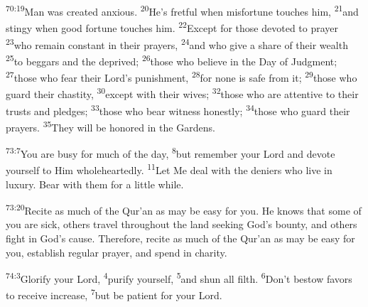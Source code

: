 \documentclass[openany,12pt,english]{book}
\newenvironment{para}{\par\pretolerance=100\tolerance=200\setlength{\emergencystretch}{0.6em}\relax}{\par}
\begin{document}
\begin{para}
    \textsuperscript{70:19}\thinspace{}Man was cre\-at\-ed anx\-ious.
    \textsuperscript{20}\thinspace{}He's fret\-ful when mis\-for\-tune touches him,
    \textsuperscript{21}\thinspace{}and sting\-y when good for\-tune touches him.
    \textsuperscript{22}\thinspace{}Ex\-cept for those de\-vot\-ed to pray\-er
    \textsuperscript{23}\thinspace{}who re\-main con\-stant in their prayers,
    \textsuperscript{24}\thinspace{}and who give a share of their wealth
    \textsuperscript{25}\thinspace{}to beggars and the de\-prived;
    \textsuperscript{26}\thinspace{}those who be\-lieve in the Day of Judg\-ment;
    \textsuperscript{27}\thinspace{}those who fear their Lord's pun\-ish\-ment,
    \textsuperscript{28}\thinspace{}for none is safe from it;
    \textsuperscript{29}\thinspace{}those who guard their chas\-ti\-ty,
    \textsuperscript{30}\thinspace{}ex\-cept with their wives;
    \textsuperscript{32}\thinspace{}those who are at\-ten\-tive to their trusts and pledges;
    \textsuperscript{33}\thinspace{}those who bear wit\-ness hon\-est\-ly;
    \textsuperscript{34}\thinspace{}those who guard their prayers.
    \textsuperscript{35}\thinspace{}They will be honored in the Gardens.
\end{para}

\bigskip{}

\begin{para}
    \textsuperscript{73:7}\thinspace{}You are bus\-y for much of the day,
    \textsuperscript{8}\thinspace{}but re\-mem\-ber your Lord and de\-vote your\-self to Him whole\-heart\-ed\-ly.
    \textsuperscript{11}\thinspace{}Let Me deal with the deniers who live in lux\-u\-ry. Bear with them for a lit\-tle while.
\end{para}

\begin{para}
    \textsuperscript{73:20}\thinspace{}Re\-cite as much of the Qur'an as may be eas\-y for you. He knows that some of you are sick, others trav\-el through\-out the land seek\-ing God's boun\-ty, and others fight in God's cause. There\-fore, re\-cite as much of the Qur'an as may be eas\-y for you, es\-tab\-lish reg\-u\-lar pray\-er, and spend in char\-i\-ty.
\end{para}

\bigskip{}

\begin{para}
    \textsuperscript{74:3}\thinspace{}Glo\-ri\-fy your Lord,
    \textsuperscript{4}\thinspace{}pu\-ri\-fy your\-self,
    \textsuperscript{5}\thinspace{}and shun all filth.
    \textsuperscript{6}\thinspace{}Don't be\-stow fa\-vors to re\-ceive in\-crease,
    \textsuperscript{7}\thinspace{}but be pa\-tient for your Lord.
\end{para}
\end{document}
